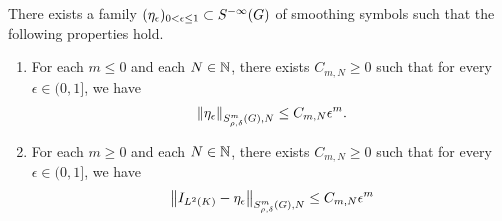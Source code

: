 \begin{theorem}
\label{theorem:generalised_Littlewood-Paley_decomposition}
    There exists a family $(\eta_\epsilon)_{0 < \epsilon \leq 1} \subset \SmoothingSymbols$ of smoothing symbols
    such that the following properties hold.
    \begin{enumerate}
        \item \label{item:generalised_Littlewood-Paley_decomposition:negative_m}
            For each $m \leq 0$ and each $N \in \N$,
            there exists $C_{m, N} \geq 0$ such that for every $\epsilon \in (0, 1]$,
            we have
            \begin{align*}
                \SymbolSemiNorm m {\rho, \delta} N {\eta_\epsilon} \leq C_{m, N} \epsilon^m.
            \end{align*}
        \item \label{item:generalised_Littlewood-Paley_decomposition:positive_m}
            For each $m \geq 0$ and each $N \in \N$,
            there exists $C_{m, N} \geq 0$ such that for every $\epsilon \in (0, 1]$,
            we have
            \begin{align*}
                \SymbolSemiNorm m {\rho, \delta} N {\Id {\Lebesgue 2 \CompactGroup} - \eta_\epsilon} \leq C_{m, N} \epsilon^m
            \end{align*}
    \end{enumerate}
\end{theorem}
